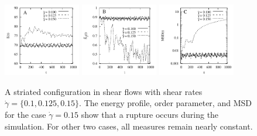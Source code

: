 \documentclass[aps,prl,preprint,groupedaddress]{revtex4-2}
\begin{document}
\begin{figure}
  \begin{center}
  \includegraphics[width=0.3\textwidth]{CS_E.pdf}
   \includegraphics[width=0.3\textwidth]{CS_LOP.pdf}
    \includegraphics[width=0.3\textwidth]{CS_MSD.pdf}
  \end{center}
\caption{\label{fig:BC3_shear} A striated configuration in shear flows with shear rates $\dot\gamma=\{0.1, 0.125, 0.15\}$. The energy profile, order parameter, and MSD for the case $\dot\gamma=0.15$ show that a rupture occurs during the simulation. For other two cases, all measures remain nearly constant. }
\end{figure}
\end{document}
